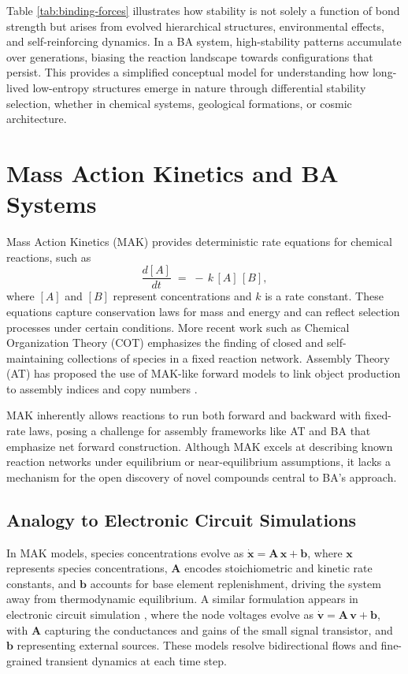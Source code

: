 \documentclass[preprint,12pt]{elsarticle}
\begin{document}
Table \ref{tab:binding-forces} illustrates how stability is not solely a function of bond strength but arises from evolved hierarchical structures, environmental effects, and self-reinforcing dynamics. In a BA system, high-stability patterns accumulate over generations, biasing the reaction landscape towards configurations that persist. This provides a simplified conceptual model for understanding how long-lived low-entropy structures emerge in nature through differential stability selection, whether in chemical systems, geological formations, or cosmic architecture.


\section{Mass Action Kinetics and BA Systems}
\label{subsec:mak-forward-limitations}

Mass Action Kinetics (MAK) \cite{TuranyiTomlin2014} provides deterministic rate equations for chemical reactions, such as
\[
\frac{d[A]}{dt} \;=\; -\,k\, [A]\,[B],
\]
where $[A]$ and $[B]$ represent concentrations and $k$ is a rate constant. These equations capture conservation laws for mass and energy and can reflect selection processes under certain conditions. More recent work such as Chemical Organization Theory (COT) \cite{DittrichFenizio2005} emphasizes the finding of closed and self-maintaining collections of species in a fixed reaction network. Assembly Theory (AT) has proposed the use of MAK-like forward models to link object production to assembly indices and copy numbers \cite{walker2023nature}.

MAK inherently allows reactions to run both forward and backward with fixed-rate laws, posing a challenge for assembly frameworks like AT and BA that emphasize net forward construction. Although MAK excels at describing known reaction networks under equilibrium or near-equilibrium assumptions, it lacks a mechanism for the open discovery of novel compounds central to BA’s approach.

\subsection{Analogy to Electronic Circuit Simulations}
\label{subsec:spice-analogy}

In MAK models, species concentrations evolve as
$\dot{\mathbf{x}} = \mathbf{A}\,\mathbf{x} + \mathbf{b}$, where \(\mathbf{x}\) represents species concentrations, \(\mathbf{A}\) encodes stoichiometric and kinetic rate constants, and \(\mathbf{b}\) accounts for base element replenishment, driving the system away from thermodynamic equilibrium. A similar formulation appears in electronic circuit simulation \cite{SpiceRef}, where the node voltages evolve as
$\dot{\mathbf{v}} = \mathbf{A}\,\mathbf{v} + \mathbf{b}$, with \(\mathbf{A}\) capturing the conductances and gains of the small signal transistor, and \(\mathbf{b}\) representing external sources. These models resolve bidirectional flows and fine-grained transient dynamics at each time step.
\end{document}
